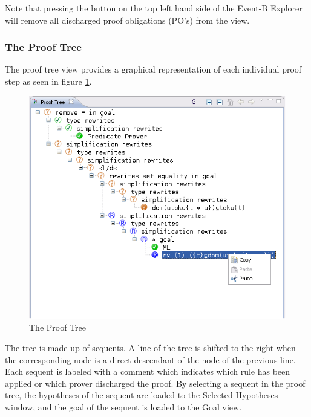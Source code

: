 Note that pressing the  button on the top left hand side of the \textsf{Event-B Explorer} will remove all discharged proof obligations (PO's) from the view. 

\subsubsection{The Proof Tree}
\label{proof_tree_view}

The proof tree view provides a graphical representation of each individual proof step as seen in figure \ref{fig_ref_01_proving_perspective2}.

\begin{figure}[!ht]
\begin{center}
	\includegraphics{img/reference/ref_01_proving_perspective2.png}
	\caption{The Proof Tree}
	\label{fig_ref_01_proving_perspective2}
\end{center}
\end{figure}

The tree is made up of sequents. A line of the tree is shifted to the right when the corresponding node is a direct descendant of the node of the previous line. Each sequent is labeled with a comment which indicates which rule has been applied or which prover discharged the proof. By selecting a sequent in the proof tree, the hypotheses of the sequent are loaded to the \textsf{Selected Hypotheses window}, and the goal of the sequent is loaded to the \textsf{Goal view}.

